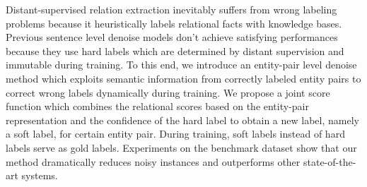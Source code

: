 Distant-supervised relation extraction inevitably suffers from wrong labeling problems because it heuristically labels relational facts with knowledge bases. Previous sentence level denoise models don't achieve satisfying performances because they use hard labels which are determined by distant supervision and immutable during training. To this end, we introduce an entity-pair level denoise method which exploits semantic information from correctly labeled entity pairs to correct wrong labels dynamically during training. We propose a joint score function which combines the relational scores based on the entity-pair representation and the confidence of the hard label to obtain a new label, namely a soft label, for certain entity pair. During training, soft labels instead of hard labels serve as gold labels. Experiments on the benchmark dataset show that our method dramatically reduces noisy instances and outperforms other state-of-the-art systems.
